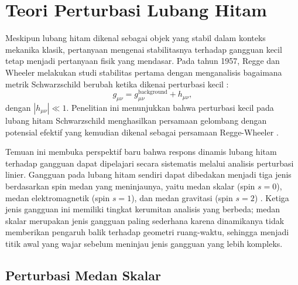 \section{Teori Perturbasi Lubang Hitam}
\label{sec:teori_perturbasi}

\noindent Meskipun lubang hitam dikenal sebagai objek yang stabil dalam konteks mekanika 
klasik, pertanyaan mengenai stabilitasnya terhadap gangguan kecil tetap menjadi pertanyaan 
fisik yang mendasar. Pada tahun 1957, Regge dan Wheeler melakukan studi stabilitas pertama 
dengan menganalisis bagaimana metrik Schwarzschild berubah ketika dikenai perturbasi kecil 
\parencite{Regge1957}:
\begin{equation}
    g_{\mu\nu} = g_{\mu\nu}^{\text{background}} + h_{\mu\nu},
\end{equation}
dengan $|h_{\mu\nu}| \ll 1$. Penelitian ini menunjukkan bahwa perturbasi kecil pada lubang hitam Schwarzschild menghasilkan persamaan gelombang dengan potensial efektif yang kemudian dikenal sebagai persamaan Regge-Wheeler \parencite{Frolov1998}.

Temuan ini membuka perspektif baru bahwa respons dinamis lubang hitam terhadap gangguan 
dapat dipelajari secara sistematis melalui analisis perturbasi linier. Gangguan pada lubang 
hitam sendiri dapat dibedakan menjadi tiga jenis berdasarkan spin medan yang meninjaunya, 
yaitu medan skalar (spin $s=0$), medan elektromagnetik (spin $s=1$), dan medan gravitasi 
(spin $s=2$) \parencite{Konoplya2011}. Ketiga jenis gangguan ini memiliki tingkat kerumitan 
analisis yang berbeda; medan skalar merupakan jenis gangguan paling sederhana karena 
dinamikanya tidak memberikan pengaruh balik terhadap geometri ruang-waktu, sehingga menjadi 
titik awal yang wajar sebelum meninjau jenis gangguan yang lebih kompleks.

\subsection{Perturbasi Medan Skalar}
\label{subsec:perturbasi-skalar}
 
